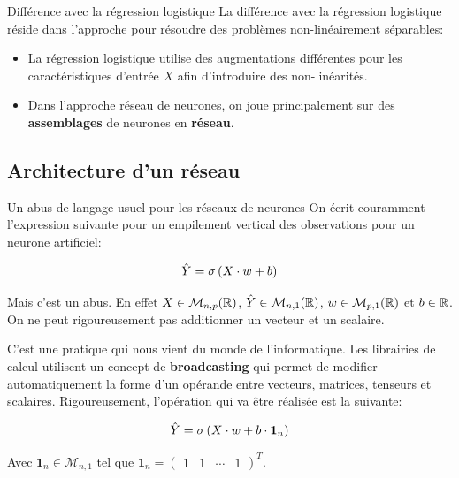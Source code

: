 \begin{frame}{Différence avec la régression logistique}
	La différence avec la régression logistique réside dans l'approche pour résoudre des problèmes non-linéairement séparables:
	\begin{itemize}
		\item La régression logistique utilise des augmentations différentes pour les caractéristiques d'entrée $X$ afin d'introduire des non-linéarités.
		\item Dans l'approche réseau de neurones, on joue principalement sur des \textbf{assemblages} de neurones en \textbf{réseau}.
	\end{itemize}
\end{frame}

\subsection[Architecture d'un réseau]{Architecture d'un réseau}

\begin{frame}{Un abus de langage usuel pour les réseaux de neurones}
	On écrit couramment l'expression suivante pour un empilement vertical des observations pour un neurone artificiel:
	
	\begin{equation*}
		\hat{Y} = \operatorname{\sigma}\left(X \cdot w + b\right)
	\end{equation*}
	
	Mais c'est un abus. En effet $X \in \mathcal{M}_{n,p}(\mathbb{R})$, $\hat{Y} \in \mathcal{M}_{n,1}(\mathbb{R})$, $w \in \mathcal{M}_{p,1}(\mathbb{R})$ et $b \in \mathbb{R}$. On ne peut rigoureusement pas additionner un vecteur et un scalaire.
	
	\vspace{0.2cm}
	\pause
	
	C'est une pratique qui nous vient du monde de l'informatique. Les librairies de calcul utilisent un concept de \textbf{broadcasting} qui permet de modifier automatiquement la forme d'un opérande entre vecteurs, matrices, tenseurs et scalaires. Rigoureusement, l'opération qui va être réalisée est la suivante:
	
	\begin{equation*}
		\hat{Y} = \operatorname{\sigma}\left(X \cdot w + b \cdot \mathbf{1}_n\right)
	\end{equation*}
	
	Avec $\mathbf{1}_n \in \mathcal{M}_{n,1}$ tel que $\mathbf{1}_n = \begin{pmatrix}
		1 & 1 & \cdots & 1
	\end{pmatrix}^T$.
\end{frame}


